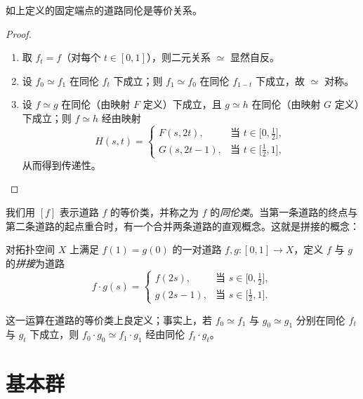
\begin{proposition}[1.9]
如上定义的固定端点的道路同伦是等价关系。
\end{proposition}

\begin{proof}
\begin{enumerate}
\item 取 $f_t=f$（对每个 $t\in[0,1]$），则二元关系 $\simeq$ 显然自反。
\item 设 $f_0\simeq f_1$ 在同伦 $f_t$ 下成立；则 $f_1\simeq f_0$ 在同伦 $f_{1-t}$ 下成立，故 $\simeq$ 对称。
\item 设 $f\simeq g$ 在同伦（由映射 $F$ 定义）下成立，且 $g\simeq h$ 在同伦（由映射 $G$ 定义）下成立；则 $f\simeq h$ 经由映射
\[
H(s,t)=
\begin{cases}
F(s,2t), & \text{当 } t\in\bigl[0,\tfrac12\bigr],\\[3pt]
G(s,2t-1), & \text{当 } t\in\bigl[\tfrac12,1\bigr],
\end{cases}
\]
从而得到传递性。
\end{enumerate}
\end{proof}


我们用 $[f]$ 表示道路 $f$ 的等价类，并称之为 $f$ 的\emph{同伦类}。当第一条道路的终点与第二条道路的起点重合时，有一个合并两条道路的直观概念。这就是拼接的概念：

\begin{definition}[1.10]
对拓扑空间 $X$ 上满足 $f(1)=g(0)$ 的一对道路 $f,g\colon[0,1]\to X$，定义 $f$ 与 $g$ 的\emph{拼接}为道路
\[
f\cdot g(s)=
\begin{cases}
f(2s), & \text{当 } s\in\bigl[0,\tfrac12\bigr],\\[3pt]
g(2s-1), & \text{当 } s\in\bigl[\tfrac12,1\bigr].
\end{cases}
\]
\end{definition}

这一运算在道路的等价类上良定义；事实上，若 $f_0\simeq f_1$ 与 $g_0\simeq g_1$ 分别在同伦 $f_t$ 与 $g_t$ 下成立，则 $f_0\cdot g_0\simeq f_1\cdot g_1$ 经由同伦 $f_t\cdot g_t$。

\section{基本群}

